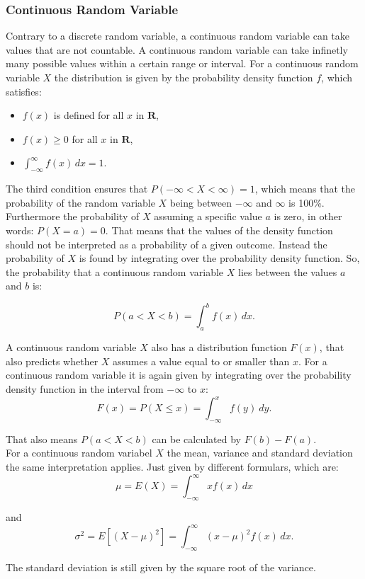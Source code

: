 \subsubsection{Continuous Random Variable}
Contrary to a discrete random variable, a continuous random variable can take values that are not countable. A continuous random variable can take infinetly many possible values within a certain range or interval. For a continuous random variable $X$ the distribution is given by the probability density function $f$, which satisfies:

\begin{itemize}
	\item $f(x)$ is defined for all $x$ in $\textbf{R}$,
	\item $f(x) \geq 0$ for all $x$ in $\textbf{R}$,
	\item $\int_{-\infty}^{\infty} f(x) \, dx = 1.$
\end{itemize}

\noindent The third condition ensures that $P(-\infty < X < \infty) = 1$, which means that the probability of the random variable $X$ being between $-\infty$ and $\infty$ is 100\%. Furthermore the probability of $X$ assuming a specific value $a$ is zero, in other words: $P(X=a)=0$. That means that the values of the density function should not be interpreted as a probability of a given outcome. Instead the probability of $X$ is found by integrating over the probability density function. So, the probability that a continuous random variable $X$ lies between the values $a$ and $b$ is: 

\begin{equation}
P(a < X < b) = \int_a^b f(x) \, dx.
\end{equation}


\noindent A continuous random variable $X$ also has a distribution function $F(x)$, that also predicts whether $X$ assumes a value equal to or smaller than $x$. For a continuous random variable it is again given by integrating over the probability density function in the interval from $-\infty$ to $x$:
\begin{equation}
F(x) = P(X \leq x) = \int_{-\infty}^{x} f(y) \ dy.
\end{equation}


\noindent That also means $P(a<X<b)$ can be calculated by $F(b)-F(a)$.
\\

\noindent For a continuous random variabel $X$ the mean, variance and standard deviation the same interpretation applies. Just given by different formulars, which are:
\begin{equation}
	\mu = E(X) = \int_{-\infty}^{\infty} x f(x) \, dx
\end{equation}

\noindent and
\begin{equation}
\sigma^2 = E\left[(X - \mu)^2\right] = \int_{-\infty}^{\infty} (x - \mu)^2 f(x) \, dx.
\end{equation}

\noindent The standard deviation is still given by the square root of the variance.

